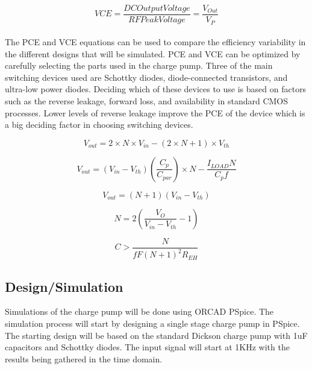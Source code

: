 \documentclass[12pt]{article}
\begin{document}
\begin{equation}
VCE = \frac{DC Output Voltage}{RF Peak Voltage} = \frac{V_{Out}}{V_{P}}\label{eq:VCE}
\end{equation}
\\
	The PCE and VCE equations can be used to compare the efficiency variability in the different designs that will be simulated. PCE and VCE can be optimized by carefully selecting the parts used in the charge pump. Three of the main switching devices used are Schottky diodes, diode-connected transistors, and ultra-low power diodes. Deciding which of these devices to use is based on factors such as the reverse leakage, forward loss, and availability in standard CMOS processes. Lower levels of reverse leakage improve the PCE of the device which is a big deciding factor in choosing switching devices.
	
\begin{equation}
V_{out} = 2\times N\times V_{in} - (2\times N + 1)\times V_{th}
\end{equation}

\begin{equation}
V_{out} = (V_{in} - V_{th})(\frac{C_p}{C_{par}})\times N - \frac{I_{LOAD}N}{C_pf}
\end{equation}

\begin{equation}
V_{out} = (N + 1)(V_{in} - V_{th})
\end{equation}

\begin{equation}
N = 2(\frac{V_O}{V_{in}-V_{th}}-1)
\end{equation}

\begin{equation}
C > \frac{N}{fF(N+1)^2R_{EH}}
\end{equation}
	
	\subsection{Design/Simulation}
	Simulations of the charge pump will be done using ORCAD PSpice. The simulation process will start by designing a single stage charge pump in PSpice. The starting design will be based on the standard Dickson charge pump with 1uF capacitors and Schottky diodes. The input signal will start at 1KHz with the results being gathered in the time domain.\\
	
\end{document}
